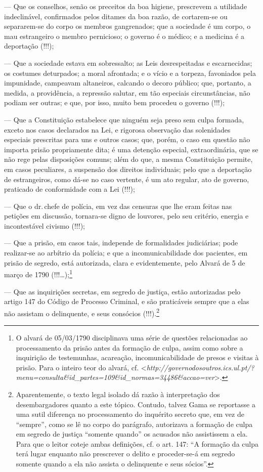 {--- Que os conselhos, senão os preceitos da boa higiene, prescrevem a
  utilidade indeclinável, confirmados pelos ditames da boa razão, de
  cortarem-se ou separarem-se do corpo os membros gangrenados; que a
  sociedade é um corpo, o mau estrangeiro o membro pernicioso; o governo
  é o médico; e a medicina é a deportação (!!!);

--- Que a sociedade estava em sobressalto; as Leis desrespeitadas e
  escarnecidas; os costumes deturpados; a moral afrontada; e o vício e a
  torpeza, favoniados pela impunidade, campeavam altaneiros, calcando o
  decoro público; que, portanto, a medida, a providência, a repressão
  salutar, em tão especiais circunstâncias, não podiam ser
  outras; e que, por isso, muito bem procedeu o governo (!!!);

--- Que a Constituição estabelece que ninguém seja preso sem culpa
  formada, exceto nos casos declarados na Lei, e rigorosa observação das
  solenidades especiais prescritas para uns e outros casos; que, porém,
  o caso em questão não importa prisão propriamente dita; é uma detenção
  especial, extraordinária, que se não rege pelas disposições comuns;
  além do que, a mesma Constituição permite, em casos peculiares, a
  suspensão dos direitos individuais; pelo que a deportação de
  estrangeiros, como dá-se no caso vertente, é um ato regular, ato de
  governo, praticado de conformidade com a Lei (!!!);

--- Que o dr.\,chefe de polícia, em vez das censuras que lhe eram feitas
  nas petições em discussão, tornara-se digno de louvores, pelo seu
  critério, energia e incontestável civismo (!!!);

--- Que a prisão, em casos tais, independe de formalidades judiciárias;
  pode realizar-se ao arbítrio da polícia; e que a incomunicabilidade
  dos pacientes, em prisão de segredo, está autorizada, clara e
  evidentemente, pelo Alvará de 5 de março de 1790 (!!!\ldots{});\footnote{
    O alvará de 05/03/1790 disciplinava uma série de questões
    relacionadas ao processamento da prisão antes da formação de culpa,
    assim como sobre a inquirição de testemunhas, acareação,
    incomunicabilidade de presos e visitas à prisão. Para o inteiro teor
    do alvará, cf.
    \textless{}\emph{http://governodosoutros.ics.ul.pt/?menu=consulta\&id\_partes=109\&id\_normas=34486\&accao=ver}\textgreater{}.}

--- Que as inquirições secretas, em segredo de justiça, estão
  autorizadas pelo artigo 147 do Código de Processo Criminal, e são
  praticáveis sempre que a elas não assistam o delinquente, e seus
  consócios (!!!).\footnote{Aparentemente, o texto legal isolado dá
    razão à interpretação dos desembargadores quanto a este tópico.
    Contudo, talvez Gama se reportasse a uma sutil diferença no
    processamento do inquérito secreto que, em vez de ``sempre'', como
    se lê no corpo do parágrafo, autorizava a formação de culpa em
    segredo de justiça ``somente quando'' os acusados não assistissem a
    ela. Para que o leitor coteje ambas definições, cf. o art. 147: ``A
    formação da culpa terá lugar enquanto não prescrever o delito e
    proceder-se-á em segredo somente quando a ela não assista o
    delinquente e seus sócios''.}

}
